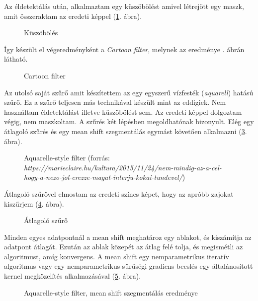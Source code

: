 Az éldetektálás után, alkalmaztam egy küszöbölést amivel létrejött egy maszk, amit összeraktam az eredeti képpel (\ref{fig:2_cartoon4}. ábra).

\begin{figure}[h!]
\centering
{}
\caption{Küszöbölés} 
\label{fig:2_cartoon4}
\end{figure}

Így készült el végeredményként a \textit{Cartoon filter}, melynek az eredménye . ábrán látható.

\begin{figure}[h!]
\centering
{}
\caption{Cartoon filter} 
\label{fig:2_cartoon5}
\end{figure}


Az utolsó saját szűrő amit készítettem az egy egyszerű vízfesték (\textit{aquarell}) hatású szűrő. Ez a szűrő teljesen más technikával készült mint az eddigiek. Nem használtam éldetektálást illetve küszöbölést sem. Az eredeti képpel dolgoztam végig, nem maszkoltam. A szűrés két lépésben megoldhatónak bizonyult. Elég egy átlagoló szűrés és egy mean shift szegmentálás egymást követően alkalmazni (\ref{fig:paint}. ábra).

\begin{figure}[h!]
\centering
{}
\caption{Aquarelle-style filter (forrás: \textit{https://marieclaire.hu/kultura/2015/11/24/nem-mindig-az-a-cel-hogy-a-nezo-jol-erezze-magat-interju-kokai-tundevel/})} 
\label{fig:paint}
\end{figure}


Átlagoló szűrővel elmostam az eredeti színes képet, hogy az apróbb zajokat kiszűrjem (\ref{fig:paint1}. ábra).

\begin{figure}[h!]
\centering
{}
\caption{Átlagoló szűrő  } 
\label{fig:paint1}
\end{figure}


Minden egyes adatpontnál a mean shift meghatároz egy ablakot, és kiszámítja az adatpont átlagát. Ezután az ablak közepét az átlag felé tolja, és megismétli az algoritmust, amíg konvergens. A mean shift egy nemparametrikus iteratív algoritmus vagy egy nemparametrikus sűrűségi gradiens becslés egy általánosított kernel megközelítés alkalmazásával (\ref{fig:paint2}. ábra).

\begin{figure}[h!]
\centering
{}
\caption{Aquarelle-style filter, mean shift szegmentálás  eredménye} 
\label{fig:paint2}
\end{figure}

